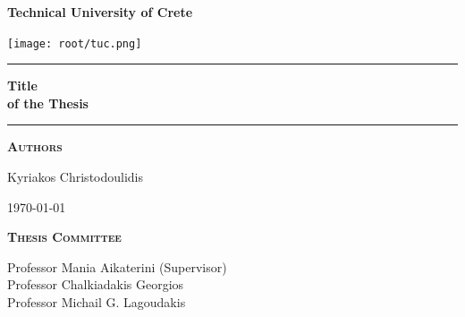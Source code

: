 
\begin{titlepage}
\begin{center}
\vspace{2cm}


\vspace{2.5cm}
{ \huge \bfseries Technical University of Crete} %
\vspace{2.5cm}


\texttt{[image: root/tuc.png]}~\\[1cm]
\vspace{2cm}

\vspace{2cm}

\hrule
\vspace{.5cm}
{ \huge \bfseries Title\\ of the Thesis} %
\vspace{.5cm}

\hrule
\vspace{1.5cm}

\textsc{\textbf{Authors}}\\
\vspace{.5cm}
\centering

Kyriakos Christodoulidis\\

\vspace{4cm}

\centering \today 

\vspace{4cm}

\textsc{\textbf{Thesis Committee}}\\

\vspace{1cm}

Professor Mania Aikaterini (Supervisor)\\
Professor Chalkiadakis Georgios\\
Professor Michail G. Lagoudakis\\
\end{center}
\end{titlepage}